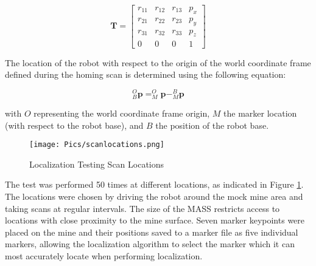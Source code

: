 \begin{equation*}
\mathbf{T} = \begin{bmatrix}
    r_{11} & r_{12} & r_{13} & p_{x} \\
    r_{21} & r_{22} & r_{23} & p_{y} \\
    r_{31} & r_{32} & r_{33} & p_{z} \\
    0 & 0 & 0 & 1
\end{bmatrix}
\end{equation*}

The location of the robot with respect to the origin of the world coordinate frame defined during the homing scan is determined using the following equation:

\begin{equation*}
^O_B\mathbf{p} = ^O_M\mathbf{p} - ^B_M\mathbf{p}
\end{equation*}

with $O$ representing the world coordinate frame origin, $M$ the marker location (with respect to the robot base), and $B$ the position of the robot base.\\

\begin{figure}
    \centering
    \texttt{[image: Pics/scanlocations.png]}
    \caption{Localization Testing Scan Locations}
    \label{fig:scanlocations}
\end{figure}

The test was performed 50 times at different locations, as indicated in Figure \ref{fig:scanlocations}. The locations were chosen by driving the robot around the mock mine area and taking scans at regular intervals. The size of the MASS restricts access to locations with close proximity to the mine surface. Seven marker keypoints were placed on the mine and their positions saved to a marker file as five individual markers, allowing the localization algorithm to select the marker which it can most accurately locate when performing localization.\\

